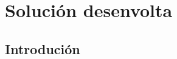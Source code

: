 %
%
\chapter[Solución desenvolta]{
	Solución desenvolta
	\label{ch.sdv.web}
}

%
%
\section[Introdución]{
	Introdución}
